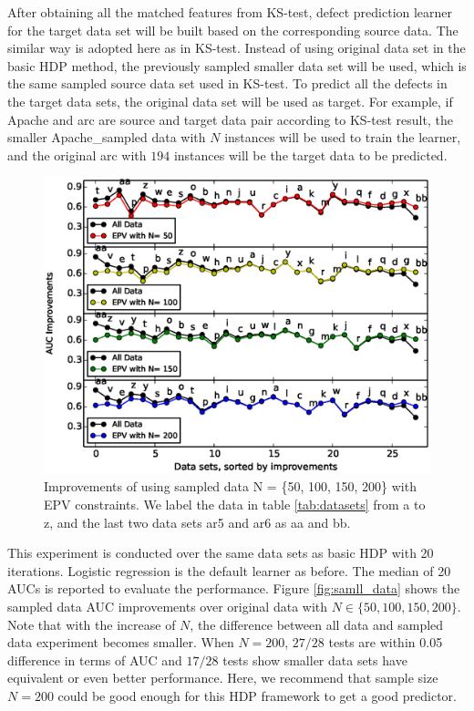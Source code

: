 After obtaining all the matched features from KS-test, defect prediction learner for the target data set will be built based on the corresponding source data. The similar way is adopted here as in KS-test. Instead of using original data set in the basic HDP method, the previously sampled smaller data set will be used, which is the same sampled source data set used in KS-test. To predict all the defects in the target data sets, the original data set will be used as target. For example, if Apache and arc are source and target data pair according to KS-test result, the smaller Apache\_sampled data with $N$ instances will be used to train the learner, and the original arc with $194$ instances will be the target data to be predicted.


\begin{figure}[!htp]
	\centering
	\includegraphics[width=\linewidth]{Figures/raleigh/sample_epv.eps}
	\caption{Improvements of using sampled data N = \{50, 100, 150, 200\} with EPV constraints. We label the data in table \ref{tab:datasets} from a to z, and the last two data sets ar5 and ar6 as aa and bb.}
	\label{fig:small_epv}
\end{figure}

This experiment is conducted over the same data sets as basic HDP with 20 iterations. Logistic regression is the default learner as before. The median of 20 AUCs is reported to evaluate the performance. 
Figure \ref{fig:samll_data} shows the sampled data AUC improvements over original data with $N \in \{50,100,150,200\}$. Note that with the increase of $N$, the difference between all data and sampled data experiment becomes smaller. When $N=200$, $27/28$ tests are within 0.05 difference in terms of AUC and $17/28$ tests show smaller data sets have equivalent or even better performance. Here, we recommend that sample size $N=200$ could be good enough for this HDP framework to get a good predictor.





